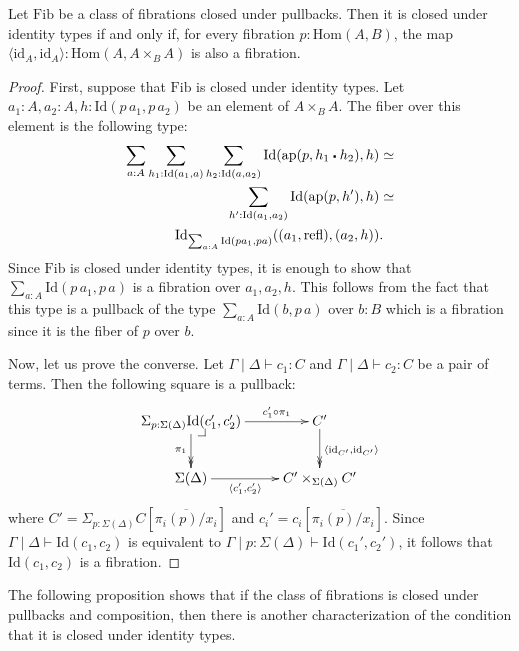 \documentclass[reqno]{mscs}
\makeatletter
\newcommand{\fs}[1]{\mathrm{#1}}
\newcommand{\Hom}{\fs{Hom}}
\newcommand{\Id}{\fs{Id}}
\newcommand{\refl}{\fs{refl}}
\newcommand{\id}{\fs{id}}
\newcommand{\pmap}{\fs{ap}}
\newcommand{\Fib}{\fs{Fib}}
\numberwithin{figure}{section}
\newcommand{\ct}{%
  \mathchoice{\mathbin{\raisebox{0.25ex}{$\displaystyle\centerdot$}}}%
             {\mathbin{\raisebox{0.25ex}{$\centerdot$}}}%
             {\mathbin{\raisebox{0.25ex}{$\scriptstyle\,\centerdot\,$}}}%
             {\mathbin{\raisebox{0.25ex}{$\scriptscriptstyle\,\centerdot\,$}}}
}
\newcommand{\pb}[1][dr]{\save*!/#1-1.2pc/#1:(-1,1)@^{|-}\restore}
\makeatother
\begin{document}
\begin{prop}[fib-id]
Let $\Fib$ be a class of fibrations closed under pullbacks.
Then it is closed under identity types if and only if, for every fibration $p : \Hom(A,B)$, the map $\langle \id_A, \id_A \rangle : \Hom(A, A \times_B A)$ is also a fibration.
\end{prop}
\begin{proof}
First, suppose that $\Fib$ is closed under identity types.
Let $a_1 : A, a_2 : A, h : \Id(p\,a_1,p\,a_2)$ be an element of $A \times_B A$.
The fiber over this element is the following type:
\begin{align*}
\sum_{a : A} \sum_{h_1 : \Id(a_1,a)} \sum_{h_2 : \Id(a,a_2)} \Id(\pmap(p, h_1 \ct h_2), h) & \simeq \\
\sum_{h' : \Id(a_1,a_2)} \Id(\pmap(p,h'),h) & \simeq \\
\Id_{\sum_{a : A} \Id(p a_1, p a)}((a_1,\refl), (a_2,h)) & .
\end{align*}
Since $\Fib$ is closed under identity types, it is enough to show that $\sum_{a : A} \Id(p\,a_1,p\,a)$ is a fibration over $a_1,a_2,h$.
This follows from the fact that this type is a pullback of the type $\sum_{a : A} \Id(b,p\,a)$ over $b : B$ which is a fibration since it is the fiber of $p$ over $b$.

Now, let us prove the converse.
Let $\Gamma \mid \Delta \vdash c_1 : C$ and $\Gamma \mid \Delta \vdash c_2 : C$ be a pair of terms.
Then the following square is a pullback:
\[ \xymatrix{ \Sigma_{p : \Sigma(\Delta)} \Id(c_1',c_2') \ar[r]^-{c_1' \circ \pi_1} \ar@{->>}[d]_{\pi_1} \pb    & C' \ar@{->>}[d]^{\langle \id_{C'}, \id_{C'} \rangle} \\
              \Sigma(\Delta) \ar[r]_-{\langle c_1', c_2' \rangle}                                               & C' \times_{\Sigma(\Delta)} C'
            } \]
where $C' = \Sigma_{p : \Sigma(\Delta)} C[\overline{\pi_i(p)/x_i}]$ and $c_i' = c_i[\overline{\pi_i(p)/x_i}]$.
Since $\Gamma \mid \Delta \vdash \Id(c_1,c_2)$ is equivalent to $\Gamma \mid p : \Sigma(\Delta) \vdash \Id(c_1',c_2')$, it follows that $\Id(c_1,c_2)$ is a fibration.
\end{proof}

The following proposition shows that if the class of fibrations is closed under pullbacks and composition, then there is another characterization of the condition that it is closed under identity types.
\end{document}
